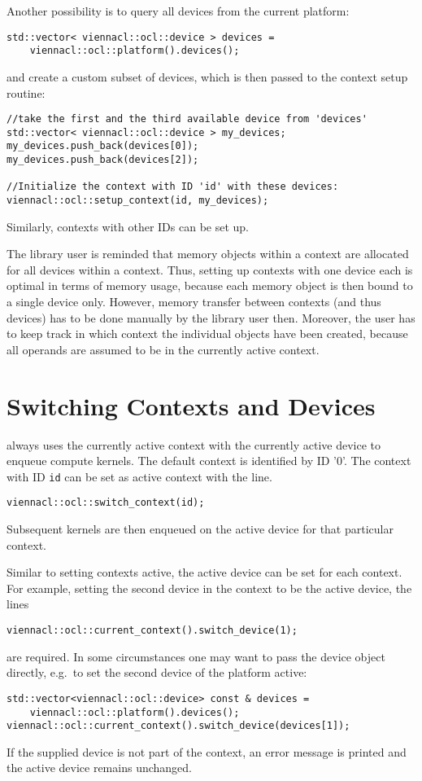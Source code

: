 Another possibility is to query all devices from the current platform:
\begin{lstlisting}
std::vector< viennacl::ocl::device > devices =
    viennacl::ocl::platform().devices();
\end{lstlisting}
and create a custom subset of devices, which is then passed to the context setup routine:
\begin{lstlisting}
//take the first and the third available device from 'devices'
std::vector< viennacl::ocl::device > my_devices;
my_devices.push_back(devices[0]);
my_devices.push_back(devices[2]);

//Initialize the context with ID 'id' with these devices:
viennacl::ocl::setup_context(id, my_devices);
\end{lstlisting}
Similarly, contexts with other IDs can be set up.


The library user is reminded that memory objects within a context are allocated for all devices within a context.
Thus, setting up contexts with one device each is optimal in terms of memory usage, because each memory object is then bound to a single device only.
However, memory transfer between contexts (and thus devices) has to be done manually by the library user then. Moreover, the user has
to keep track in which context the individual {\ViennaCL} objects have been created, because all operands are assumed to be in the currently active context.

\section{Switching Contexts and Devices}
{\ViennaCL} always uses the currently active context with the currently active device to enqueue compute kernels. The default context is identified by ID '$0$'.
The context with ID \lstinline|id| can be set as active context with the line.
\begin{lstlisting}
viennacl::ocl::switch_context(id);
\end{lstlisting}
Subsequent kernels are then enqueued on the active device for that particular context.

Similar to setting contexts active, the active device can be set for each context. For example, setting the second device in the context to be the active device, the lines
\begin{lstlisting}
viennacl::ocl::current_context().switch_device(1);
\end{lstlisting}
are required. In some circumstances one may want to pass the device object directly, e.g.~to set the second device of the platform active:
\begin{lstlisting}
std::vector<viennacl::ocl::device> const & devices =
    viennacl::ocl::platform().devices();
viennacl::ocl::current_context().switch_device(devices[1]);
\end{lstlisting}
If the supplied device is not part of the context, an error message is printed and the active device remains unchanged.
